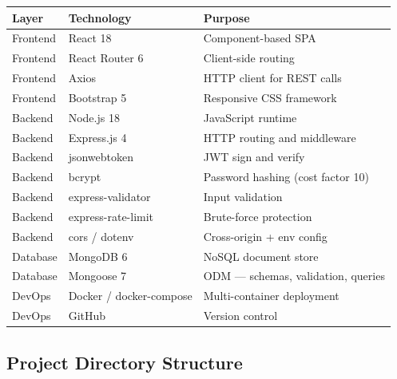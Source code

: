 \documentclass[12pt]{article}
\begin{document}
\begin{longtable}{|p{2.8cm}|p{3.5cm}|p{7cm}|}
\hline
\textbf{Layer} & \textbf{Technology} & \textbf{Purpose} \\
\hline
Frontend & React 18 & Component-based SPA \\
\hline
Frontend & React Router 6 & Client-side routing \\
\hline
Frontend & Axios & HTTP client for REST calls \\
\hline
Frontend & Bootstrap 5 & Responsive CSS framework \\
\hline
Backend & Node.js 18 & JavaScript runtime \\
\hline
Backend & Express.js 4 & HTTP routing and middleware \\
\hline
Backend & jsonwebtoken & JWT sign and verify \\
\hline
Backend & bcrypt & Password hashing (cost factor 10) \\
\hline
Backend & express-validator & Input validation \\
\hline
Backend & express-rate-limit & Brute-force protection \\
\hline
Backend & cors / dotenv & Cross-origin + env config \\
\hline
Database & MongoDB 6 & NoSQL document store \\
\hline
Database & Mongoose 7 & ODM --- schemas, validation, queries \\
\hline
DevOps & Docker / docker-compose & Multi-container deployment \\
\hline
DevOps & GitHub & Version control \\
\hline
\end{longtable}

\subsection{Project Directory Structure}
\end{document}
